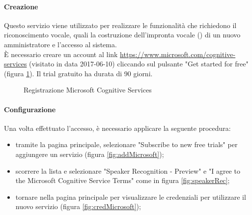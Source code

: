 \paragraph{Creazione}
Questo servizio viene utilizzato per realizzare le funzionalità che richiedono il riconoscimento vocale, quali la costruzione dell'impronta vocale () di un nuovo amministratore e l'accesso al sistema.\\
È necessario creare un account al link \url{https://www.microsoft.com/cognitive-services} (visitato in data 2017-06-10) cliccando sul pulsante "Get started for free" (figura \ref{fig:microsoft}). Il trial gratuito ha durata di 90 giorni.
\begin{figure}[H]
	\caption{Registrazione Microsoft Cognitive Services}\label{fig:microsoft}
\end{figure}
\paragraph{Configurazione}
Una volta effettuato l'accesso, è necessario applicare la seguente procedura:
\begin{itemize}
	\item tramite la pagina principale, selezionare "Subscribe to new free trials" per aggiungere un servizio (figura \ref{fig:addMicrosoft});
	\item scorrere la lista e selezionare "Speaker Recognition - Preview" e "I agree to the Microsoft Cognitive Service Terms" come in figura \ref{fig:speakerRec};
	\item tornare nella pagina principale per visualizzare le credenziali per utilizzare il nuovo servizio (figura \ref{fig:credMicrosoft});
\end{itemize}

